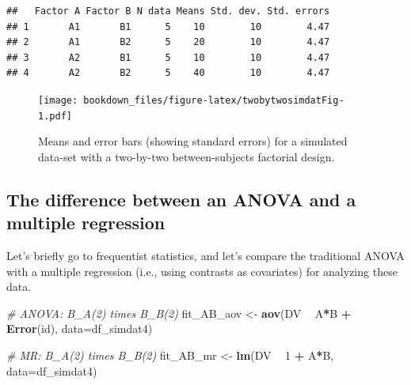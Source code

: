 \documentclass[12pt,]{krantz}
\newenvironment{Shaded}{\begin{snugshade}}{\end{snugshade}}
\newcommand{\CommentTok}[1]{\textcolor[rgb]{0.56,0.35,0.01}{\textit{#1}}}
\newcommand{\DataTypeTok}[1]{\textcolor[rgb]{0.13,0.29,0.53}{#1}}
\newcommand{\DecValTok}[1]{\textcolor[rgb]{0.00,0.00,0.81}{#1}}
\newcommand{\KeywordTok}[1]{\textcolor[rgb]{0.13,0.29,0.53}{\textbf{#1}}}
\newcommand{\NormalTok}[1]{#1}
\newcommand{\OperatorTok}[1]{\textcolor[rgb]{0.81,0.36,0.00}{\textbf{#1}}}
\newcommand{\StringTok}[1]{\textcolor[rgb]{0.31,0.60,0.02}{#1}}
\theoremstyle{definition}
\theoremstyle{definition}
\theoremstyle{definition}
\theoremstyle{remark}
\begin{document}
\begin{verbatim}
##   Factor A Factor B N data Means Std. dev. Std. errors
## 1       A1       B1      5    10        10        4.47
## 2       A1       B2      5    20        10        4.47
## 3       A2       B1      5    10        10        4.47
## 4       A2       B2      5    40        10        4.47
\end{verbatim}

\begin{figure}
\centering
\texttt{[image: bookdown\_files/figure-latex/twobytwosimdatFig-1.pdf]}
\caption{\label{fig:twobytwosimdatFig}Means and error bars (showing standard errors) for a simulated data-set with a two-by-two between-subjects factorial design.}
\end{figure}

\clearpage

\hypertarget{the-difference-between-an-anova-and-a-multiple-regression}{%
\subsection{The difference between an ANOVA and a multiple regression}\label{the-difference-between-an-anova-and-a-multiple-regression}}

Let's briefly go to frequentist statistics, and let's compare the traditional ANOVA with a multiple regression (i.e., using contrasts as covariates) for analyzing these data.

\begin{Shaded}
\begin{Highlighting}[]
\CommentTok{# ANOVA: B_A(2) times B_B(2)}
\NormalTok{fit_AB_aov <-}\StringTok{ }\KeywordTok{aov}\NormalTok{(DV }\OperatorTok{~}\StringTok{ }\NormalTok{A}\OperatorTok{*}\NormalTok{B }\OperatorTok{+}\StringTok{ }\KeywordTok{Error}\NormalTok{(id), }\DataTypeTok{data=}\NormalTok{df_simdat4)}

\CommentTok{# MR: B_A(2) times B_B(2)}
\NormalTok{fit_AB_mr <-}\StringTok{ }\KeywordTok{lm}\NormalTok{(DV }\OperatorTok{~}\StringTok{ }\DecValTok{1} \OperatorTok{+}\StringTok{ }\NormalTok{A}\OperatorTok{*}\NormalTok{B, }\DataTypeTok{data=}\NormalTok{df_simdat4)}
\end{Highlighting}
\end{Shaded}

\begin{Shaded}
\end{Shaded}
\end{document}
